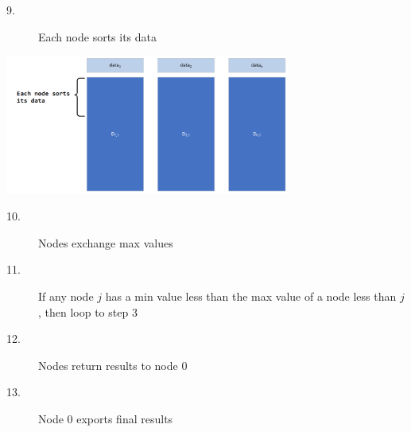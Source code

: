 \documentclass[letter]{article}
\begin{document}
\begin{description}
\item[9.]{Each node sorts its data}
\end{description}
\includegraphics[width=0.7\textwidth]{images/Capture0.PNG}

\begin{description}
\item[10.]{Nodes exchange max values}
\item[11.]{If any node $j$ has a min value less than the max value of a node less than $j$, then loop to step 3}
\item[12.]{Nodes return results to node 0}
\item[13.]{Node 0 exports final results}
\end{description}
\end{document}
